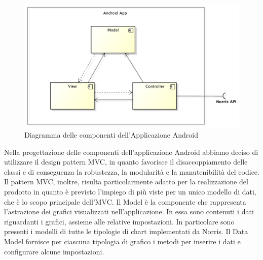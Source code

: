 	\begin{figure}[H]\centering
        \includegraphics[width=\textwidth]{SpecificaTecnica/Pics/ComponentiApplicazione}
        \caption{Diagramma delle componenti dell'Applicazione Android}
    \end{figure}
	Nella progettazione delle componenti dell'applicazione Android abbiamo deciso di utilizzare il design pattern MVC, in quanto favorisce il disaccoppiamento delle classi e di conseguenza la robustezza, la modularità e la manutenibilità del codice. \\
Il pattern MVC, inoltre, risulta particolarmente adatto per la realizzazione del prodotto in quanto è previsto l'impiego di più viste per un unico modello di dati, che è lo scopo principale dell'MVC.
        Il Model è la componente che rappresenta l'astrazione dei grafici visualizzati nell'applicazione. In essa sono contenuti i dati riguardanti i grafici, assieme alle relative impostazioni. In particolare sono presenti i modelli di tutte le tipologie di chart implementati da Norris. Il Data Model fornisce per ciascuna tipologia di grafico i metodi per inserire i dati e configurare alcune impostazioni. 
    
